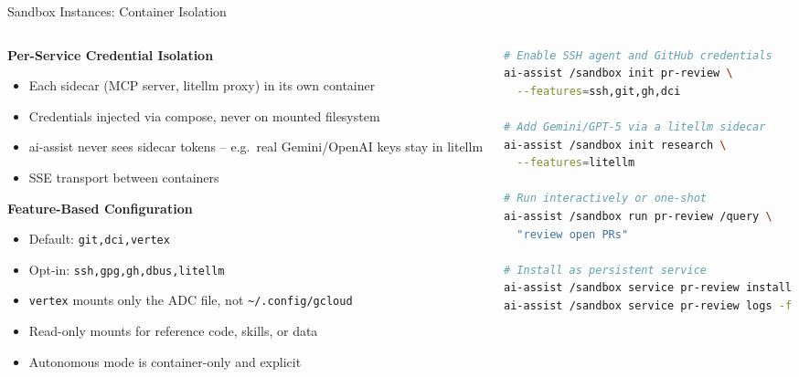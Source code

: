 \documentclass[aspectratio=169,10pt]{beamer}
\begin{document}
\begin{frame}[fragile]{Sandbox Instances: Container Isolation}
\begin{columns}[T]
\begin{column}{0.48\textwidth}
\textbf{\color{rhred}Per-Service Credential Isolation}
\begin{itemize}\scriptsize
  \item Each sidecar (MCP server, litellm proxy) in its own container
  \item Credentials injected via compose, never on mounted filesystem
  \item ai-assist never sees sidecar tokens -- e.g.\ real Gemini/OpenAI keys stay in litellm
  \item SSE transport between containers
\end{itemize}

\medskip
\textbf{\color{rhred}Feature-Based Configuration}
\begin{itemize}\scriptsize
  \item Default: \texttt{git,dci,vertex}
  \item Opt-in: \texttt{ssh,gpg,gh,dbus,litellm}
  \item \texttt{vertex} mounts only the ADC file, not \texttt{\textasciitilde/.config/gcloud}
  \item Read-only mounts for reference code, skills, or data
  \item Autonomous mode is container-only and explicit
\end{itemize}
\end{column}
\begin{column}{0.48\textwidth}
\begin{lstlisting}[basicstyle=\ttfamily\fontsize{5}{6}\selectfont,frame=single,language=bash]
# Enable SSH agent and GitHub credentials
ai-assist /sandbox init pr-review \
  --features=ssh,git,gh,dci

# Add Gemini/GPT-5 via a litellm sidecar
ai-assist /sandbox init research \
  --features=litellm

# Run interactively or one-shot
ai-assist /sandbox run pr-review /query \
  "review open PRs"

# Install as persistent service
ai-assist /sandbox service pr-review install
ai-assist /sandbox service pr-review logs -f
\end{lstlisting}


\end{column}
\end{columns}
\end{frame}
\end{document}
